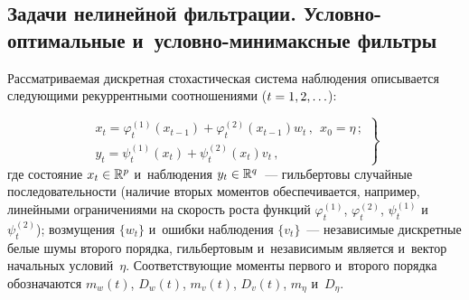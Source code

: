 \begin{multicols}{2}
\vspace*{-9pt}

\section{Задачи нелинейной фильтрации. Условно-оптимальные 
и~условно-минимаксные фильтры}

\vspace*{-2pt}

    Рассматриваемая дискретная стохастическая система наблюдения 
описывается следующими рекуррентными соотношениями ($t\hm=1,2,\ldots$):

\noindent
    \begin{equation}
    \left.
    \begin{array}{l}
    x_t=\varphi_t^{(1)}(x_{t-1})+ \varphi_t^{(2)}(x_{t-1})w_t\,,\  \ 
x_0=\eta\,;\\[6pt]
    y_t=\psi_t^{(1)}(x_t)+\psi_t^{(2)}(x_t)v_t\,,
    \end{array}
    \right\}
    \label{e1-bos}
    \end{equation}
где состояние $x_t\hm\in \mathbb{R}^p$ и~наблюдения $y_t\hm\in 
\mathbb{R}^q$~--- гильбертовы случайные последовательности (наличие 
вторых моментов обеспечивается, например, линейными ограничениями на 
скорость роста функций $\varphi_t^{(1)}$, $\varphi_t^{(2)}$, $\psi_t^{(1)}$ 
и~$\psi_t^{(2)}$); возмущения $\{w_t\}$ и~ошибки наблюдения $\{v_t\}$~--- 
независимые дискретные белые шумы второго порядка, гильбертовым 
и~независимым является и~вектор начальных условий~$\eta$. 
Соответствующие моменты первого и~второго порядка обозначаются $m_w(t)$, 
$D_w(t)$, $m_v(t)$, $D_v(t)$, $m_\eta$ и~$D_\eta$.


\end{multicols}

